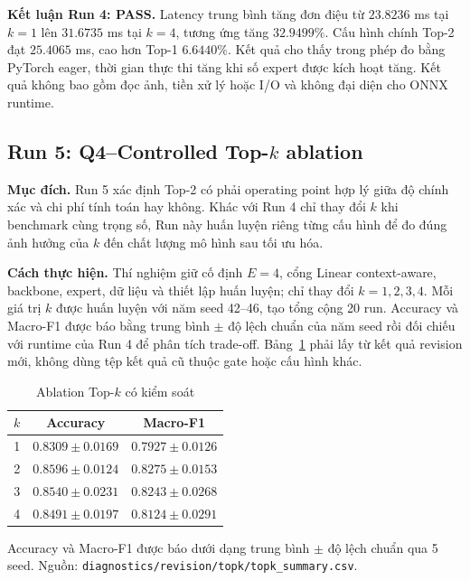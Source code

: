 \documentclass[conference]{IEEEtran}
\newcommand{\meanstd}{trung bình $\pm$ độ lệch chuẩn}
\newcommand{\best}[1]{\textbf{#1}}
\begin{document}
\textbf{Kết luận Run 4: PASS.} Latency trung bình tăng đơn điệu từ
$23.8236$ ms tại $k=1$ lên $31.6735$ ms tại $k=4$, tương ứng tăng
$32.9499\%$. Cấu hình chính Top-2 đạt $25.4065$ ms, cao hơn Top-1
$6.6440\%$. Kết quả cho thấy trong phép đo bằng PyTorch eager, thời gian thực
thi tăng khi số expert được kích hoạt tăng. Kết quả không bao gồm đọc ảnh,
tiền xử lý hoặc I/O và không đại diện cho ONNX runtime.

\subsection{Run 5: Q4--Controlled Top-\texorpdfstring{$k$}{k} ablation}

\textbf{Mục đích.} Run 5 xác định Top-2 có phải operating point hợp lý giữa
độ chính xác và chi phí tính toán hay không. Khác với Run 4 chỉ thay đổi $k$
khi benchmark cùng trọng số, Run này huấn luyện riêng từng cấu hình để đo
đúng ảnh hưởng của $k$ đến chất lượng mô hình sau tối ưu hóa.

\textbf{Cách thực hiện.} Thí nghiệm giữ cố định $E=4$, cổng Linear
context-aware, backbone, expert, dữ liệu và thiết lập huấn luyện; chỉ thay đổi
$k=1,2,3,4$. Mỗi giá trị $k$ được huấn luyện với năm seed 42--46, tạo tổng
cộng 20 run. Accuracy và Macro-F1 được báo bằng trung bình $\pm$ độ lệch
chuẩn của năm seed rồi đối chiếu với runtime của Run 4 để phân tích
trade-off. Bảng~\ref{tab:topk} phải lấy từ kết
quả revision mới, không dùng tệp kết quả cũ thuộc gate hoặc cấu hình khác.

\begin{table}[H]
\caption{Ablation Top-$k$ có kiểm soát}
\label{tab:topk}
\centering
\footnotesize
\begin{tabular}{@{}ccc@{}}
\toprule
$k$ & Accuracy & Macro-F1 \\
\midrule
1 & $0.8309\pm0.0169$ & $0.7927\pm0.0126$ \\
2 & \best{$0.8596\pm0.0124$} & \best{$0.8275\pm0.0153$} \\
3 & $0.8540\pm0.0231$ & $0.8243\pm0.0268$ \\
4 & $0.8491\pm0.0197$ & $0.8124\pm0.0291$ \\
\bottomrule
\end{tabular}
\vspace{2pt}

\raggedright\scriptsize Accuracy và Macro-F1 được báo dưới dạng \meanstd{}
qua 5 seed. Nguồn: \texttt{diagnostics/revision/topk/topk\_summary.csv}.
\end{table}
\end{document}
